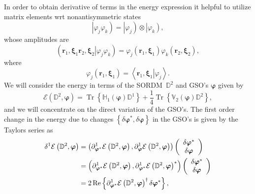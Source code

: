 \documentclass[titlepage]{article}%
\begin{document}
In order to obtain derivative of terms in the energy expression it helpful to
utilize matrix elements wrt nonantisymmetric states
\begin{equation}
\left\vert \varphi_{j}\varphi_{k}\right)  =\left\vert \varphi_{j}\right)
\otimes\left\vert \varphi_{k}\right)  ,
\end{equation}
whose amplitudes are
\begin{equation}
\left(  \left.  \bm{r}_{1}\bm{,\xi}_{1}\bm{r}_{2}\bm{,\xi}_{2}\right\vert
\varphi_{j}\varphi_{k}\right)  =\varphi_{j}\left(  \bm{r}_{1}\bm{,\xi}_{1}%
\right)  \varphi_{k}\left(  \bm{r}_{2}\bm{,\xi}_{2}\right)  ,
\end{equation}
where
\begin{equation}
\varphi_{j}\left(  \bm{r}_{1}\bm{,\xi}_{1}\right)  =\left\langle \left.
\bm{r}_{1}\bm{,\xi}_{1}\right\vert \varphi_{j}\right\rangle .
\end{equation}
We will consider the energy in terms of the SORDM\ $\mathbb{D}^{2}$ and GSO's
$\bm{\varphi}$ given by
\begin{equation}
\mathcal{E}\left(  \mathbb{D}^{2},\bm{\varphi}\right)  =\operatorname{Tr}%
\left\{  \mathbb{H}_{1}\left(  \bm{\varphi}\right)  \mathbb{D}^{1}\right\}
+\frac{1}{4}\operatorname{Tr}\left\{  \mathbb{V}_{2}\left(
\bm{\varphi}\right)  \mathbb{D}^{2}\right\}  , \label{e1}%
\end{equation}
and we will concentrate on the direct variation of the GSO's. The first order
change in the energy due to changes $\left\{  \delta\bm{\varphi}^{\ast}%
,\delta\bm{\varphi}\right\}  $ in the GSO's is given by the Taylors series as
\begin{align}
\delta^{1}\mathcal{E}\left(  \mathbb{D}^{2},\bm{\varphi}\right)   &  =\left(
\partial_{\bm{\varphi}^{\ast}}^{1}\mathcal{E}\left(  \mathbb{D}^{2}%
,\bm{\varphi}\right)  ,\partial_{\bm{\varphi}}^{1}\mathcal{E}\left(
\mathbb{D}^{2},\bm{\varphi}\right)  \right)  \left(
\begin{array}
[c]{c}%
\delta\bm{\varphi}^{\ast}\\
\delta\bm{\varphi}
\end{array}
\right) \nonumber\\
&  =\left(  \partial_{\bm{\varphi}^{\ast}}^{1}\mathcal{E}\left(
\mathbb{D}^{2},\bm{\varphi}\right)  ,\partial_{\bm{\varphi}^{\ast}}%
^{1}\mathcal{E}\left(  \mathbb{D}^{2},\bm{\varphi}\right)  ^{\ast}\right)
\left(
\begin{array}
[c]{c}%
\delta\bm{\varphi}^{\ast}\\
\delta\bm{\varphi}
\end{array}
\right) \nonumber\\
&  =2\operatorname{Re}\left\{  \partial_{\bm{\varphi}^{\ast}}^{1}%
\mathcal{E}\left(  \mathbb{D}^{2},\bm{\varphi}\right)  ^{\dagger}%
\delta\bm{\varphi}^{\ast}\right\}  ,
\end{align}
\end{document}
